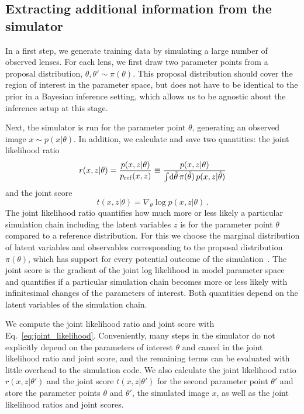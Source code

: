 \documentclass[twocolumn]{aastex62}
\begin{document}
\subsection{Extracting additional information from the simulator}
\label{sec:lfi-gold}

In a first step, we generate training data by simulating a large number of observed lenses. For each lens, we first draw two parameter points from a proposal distribution, $\theta, \theta' \sim \pi(\theta)$. This proposal distribution should cover the region of interest in the parameter space, but does not have to be identical to the prior in a Bayesian inference setting, which allows us to be agnostic about the inference setup at this stage.

Next, the simulator is run for the parameter point $\theta$, generating an observed image $x \sim p(x|\theta)$. In addition, we calculate and save two quantities: the joint likelihood ratio
%
\begin{equation}
  r(x,z | \theta) = \frac {p(x,z | \theta)} {p_\mathrm{ref}(x,z)}
  \equiv \frac {p(x,z | \theta)} {\int\!\diff\tilde{\theta} \, \pi(\tilde{\theta}) \, p(x,z | \tilde{\theta}) }
\end{equation}
%
and the joint score
%
\begin{equation}
  t(x, z | \theta) = \nabla_{\theta} \log p(x,z | \theta) \,.
\end{equation}
%
The joint likelihood ratio quantifies how much more or less likely a particular simulation chain including the latent variables $z$ is for the parameter point $\theta$ compared to a reference distribution. For this we choose the marginal distribution of latent variables and observables corresponding to the proposal distribution $\pi(\theta)$, which has support for every potential outcome of the simulation~\citep{Hermans:2019ioj}. The joint score is the gradient of the joint log likelihood in model parameter space and quantifies if a particular simulation chain becomes more or less likely with infinitesimal changes of the parameters of interest. Both quantities depend on the latent variables of the simulation chain.

We compute the joint likelihood ratio and joint score with Eq.~\eqref{eq:joint_likelihood}. Conveniently, many steps in the simulator do not explicitly depend on the parameters of interest $\theta$ and cancel in the joint likelihood ratio and joint score, and the remaining terms can be evaluated with little overhead to the simulation code. We also calculate the joint likelihood ratio $r(x,z|\theta')$ and the joint score $t(x,z|\theta')$ for the second parameter point $\theta'$ and store the parameter points $\theta$ and $\theta'$, the simulated image $x$, as well as the joint likelihood ratios and joint scores.
\end{document}
